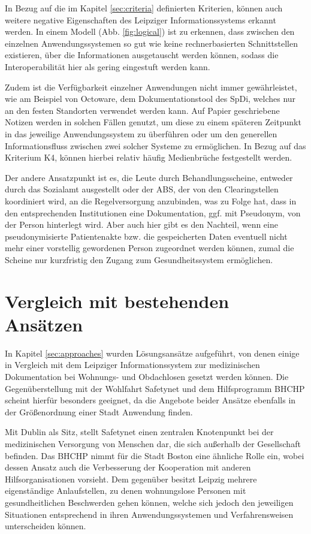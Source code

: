 In Bezug auf die im Kapitel \ref{sec:criteria} definierten Kriterien, können auch weitere negative Eigenschaften des Leipziger Informationssystems erkannt werden. In einem Modell (Abb. \ref{fig:logical}) ist zu erkennen, dass zwischen den einzelnen Anwendungssystemen so gut wie keine rechnerbasierten Schnittstellen existieren, über die Informationen ausgetauscht werden können, sodass die Interoperabilität hier als gering eingestuft werden kann.

Zudem ist die Verfügbarkeit einzelner Anwendungen nicht immer gewährleistet, wie am Beispiel von Octoware, dem Dokumentationstool des \ac{SpDi}, welches nur an den festen Standorten verwendet werden kann. Auf Papier geschriebene Notizen werden in solchen Fällen genutzt, um diese zu einem späteren Zeitpunkt in das jeweilige Anwendungssystem zu überführen oder um den generellen Informationsfluss zwischen zwei solcher Systeme zu ermöglichen. In Bezug auf das Kriterium K4, können hierbei relativ häufig Medienbrüche festgestellt werden.

Der andere Ansatzpunkt ist es, die Leute durch Behandlungsscheine, entweder durch das Sozialamt ausgestellt oder der \ac{ABS}, der von den Clearingstellen koordiniert wird, an die Regelversorgung anzubinden, was zu Folge hat, dass in den entsprechenden Institutionen eine Dokumentation, ggf. mit Pseudonym, von der Person hinterlegt wird. Aber auch hier gibt es den Nachteil, wenn eine pseudonymisierte Patientenakte bzw. die gespeicherten Daten eventuell nicht mehr einer vorstellig gewordenen Person zugeordnet werden können, zumal die Scheine nur kurzfristig den Zugang zum Gesundheitssystem ermöglichen.


\section{Vergleich mit bestehenden Ansätzen}\label{sec:compare}

In Kapitel \ref{sec:approaches} wurden Lösungsansätze aufgeführt, von denen einige in Vergleich mit dem Leipziger Informationssystem zur medizinischen Dokumentation bei Wohnungs- und Obdachlosen gesetzt werden können. Die Gegenüberstellung mit der Wohlfahrt Safetynet und dem Hilfsprogramm BHCHP scheint hierfür besonders geeignet, da die Angebote beider Ansätze ebenfalls in der Größenordnung einer Stadt Anwendung finden. 

Mit Dublin als Sitz, stellt Safetynet einen zentralen Knotenpunkt bei der medizinischen Versorgung von Menschen dar, die sich außerhalb der Gesellschaft befinden. Das BHCHP nimmt für die Stadt Boston eine ähnliche Rolle ein, wobei dessen Ansatz auch die Verbesserung der Kooperation mit anderen Hilfsorganisationen vorsieht. Dem gegenüber besitzt Leipzig mehrere eigenständige Anlaufstellen, zu denen wohnungslose Personen mit gesundheitlichen Beschwerden gehen können, welche sich jedoch den jeweiligen Situationen entsprechend in ihren Anwendungssystemen und Verfahrensweisen unterscheiden können.

